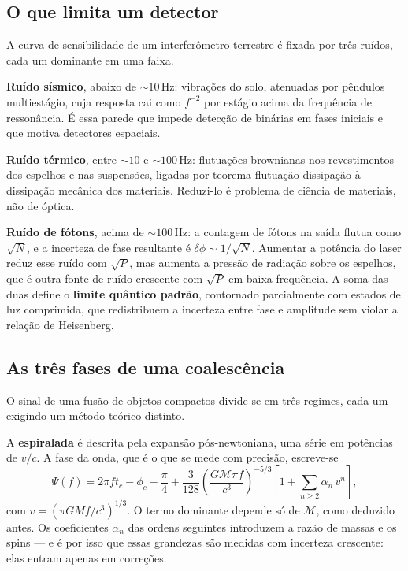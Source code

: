 \documentclass[11pt,a4paper]{article}
\begin{document}
\subsection*{O que limita um detector}

A curva de sensibilidade de um interferômetro terrestre é fixada por três ruídos, cada um dominante em uma faixa.

\textbf{Ruído sísmico}, abaixo de $\sim10\,\mathrm{Hz}$: vibrações do solo, atenuadas por pêndulos multiestágio, cuja resposta cai como $f^{-2}$ por estágio acima da frequência de ressonância. É essa parede que impede detecção de binárias em fases iniciais e que motiva detectores espaciais.

\textbf{Ruído térmico}, entre $\sim10$ e $\sim100\,\mathrm{Hz}$: flutuações brownianas nos revestimentos dos espelhos e nas suspensões, ligadas por teorema flutuação-dissipação à dissipação mecânica dos materiais. Reduzi-lo é problema de ciência de materiais, não de óptica.

\textbf{Ruído de fótons}, acima de $\sim100\,\mathrm{Hz}$: a contagem de fótons na saída flutua como $\sqrt{N}$, e a incerteza de fase resultante é $\delta\phi\sim1/\sqrt{N}$. Aumentar a potência do laser reduz esse ruído com $\sqrt{P}$, mas aumenta a pressão de radiação sobre os espelhos, que é outra fonte de ruído crescente com $\sqrt{P}$ em baixa frequência. A soma das duas define o \textbf{limite quântico padrão}, contornado parcialmente com estados de luz comprimida, que redistribuem a incerteza entre fase e amplitude sem violar a relação de Heisenberg.

\subsection*{As três fases de uma coalescência}

O sinal de uma fusão de objetos compactos divide-se em três regimes, cada um exigindo um método teórico distinto.

A \textbf{espiralada} é descrita pela expansão pós-newtoniana, uma série em potências de $v/c$. A fase da onda, que é o que se mede com precisão, escreve-se
\[
\Psi(f)=2\pi ft_c-\phi_c-\frac{\pi}{4}+\frac{3}{128}\left(\frac{G\mathcal{M}\pi f}{c^{3}}\right)^{-5/3}\left[1+\sum_{n\ge2}\alpha_n\,v^{n}\right],
\]
com $v=(\pi GMf/c^{3})^{1/3}$. O termo dominante depende só de $\mathcal{M}$, como deduzido antes. Os coeficientes $\alpha_n$ das ordens seguintes introduzem a razão de massas e os spins --- e é por isso que essas grandezas são medidas com incerteza crescente: elas entram apenas em correções.
\end{document}
